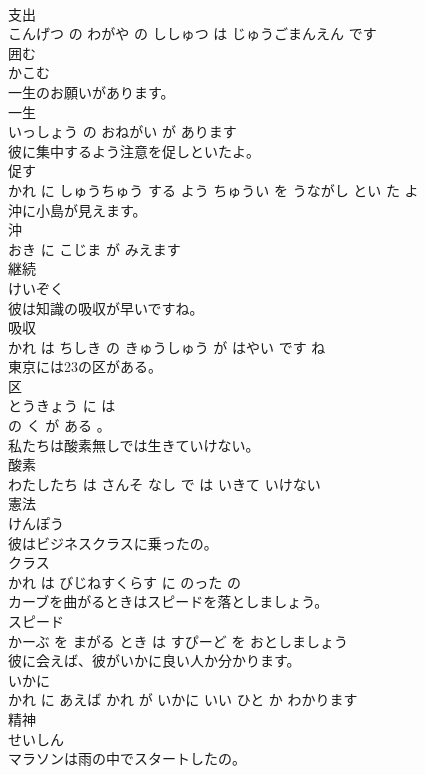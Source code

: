 \documentclass[8pt]{extreport}
\begin{document}
\begin{CJK}{UTF8}{min}
\\	支出 
\\	こんげつ の わがや の ししゅつ は じゅうごまんえん です		
\\	囲む	
\\	かこむ		
\\	一生のお願いがあります。	
\\	一生 
\\	いっしょう の おねがい が あります		
\\	彼に集中するよう注意を促しといたよ。	
\\	促す 
\\	かれ に しゅうちゅう する よう ちゅうい を うながし とい た よ		
\\	沖に小島が見えます。	
\\	沖 
\\	おき に こじま が みえます		
\\	継続	
\\	けいぞく		
\\	彼は知識の吸収が早いですね。	
\\	吸収 
\\	かれ は ちしき の きゅうしゅう が はやい です ね		
\\	東京には23の区がある。	
\\	区 
\\	とうきょう に は 
\\	の く が ある 。		
\\	私たちは酸素無しでは生きていけない。	
\\	酸素 
\\	わたしたち は さんそ なし で は いきて いけない		
\\	憲法	
\\	けんぽう		
\\	彼はビジネスクラスに乗ったの。	
\\	クラス 
\\	かれ は びじねすくらす に のった の		
\\	カーブを曲がるときはスピードを落としましょう。	
\\	スピード 
\\	かーぶ を まがる とき は すぴーど を おとしましょう		
\\	彼に会えば、彼がいかに良い人か分かります。	
\\	いかに 
\\	かれ に あえば かれ が いかに いい ひと か わかります		
\\	精神	
\\	せいしん		
\\	マラソンは雨の中でスタートしたの。	

\end{CJK}
\end{document}
